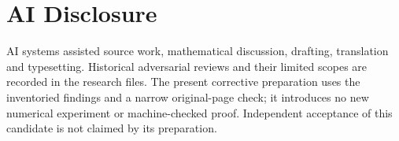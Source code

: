 \section*{AI Disclosure}
AI systems assisted source work, mathematical discussion, drafting,
translation and typesetting. Historical adversarial reviews and their
limited scopes are recorded in the research files. The present corrective
preparation uses the inventoried findings and a narrow original-page check;
it introduces no new numerical experiment or machine-checked proof.
Independent acceptance of this candidate is not claimed by its preparation.
